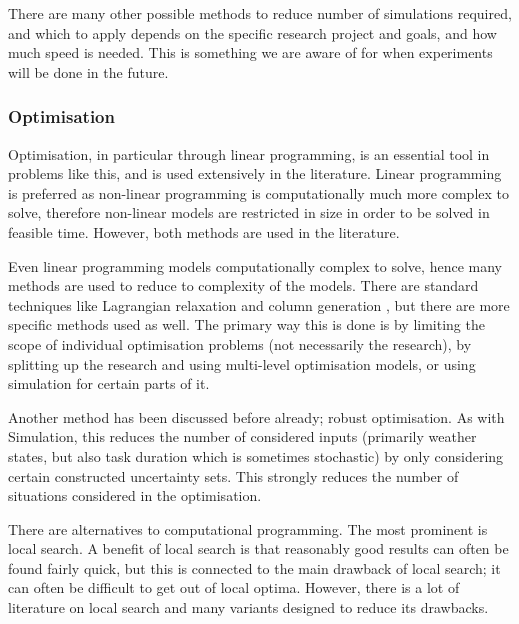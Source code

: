 \documentclass[a4paper,12pt]{article}
\begin{document}
There are many other possible methods to reduce number of simulations required, and which to apply depends on the specific research project and goals, and how much speed is needed. This is something we are aware of for when experiments will be done in the future. 

\bigskip

\subsubsection{Optimisation} \label{ss:opt}
Optimisation, in particular through linear programming, is an essential tool in problems like this, and is used extensively in the literature. Linear programming is preferred as non-linear programming is computationally much more complex to solve, therefore non-linear models are restricted in size in order to be solved in feasible time. However, both methods are used in the literature.

Even linear programming models computationally complex to solve, hence many methods are used to reduce to complexity of the models. There are standard techniques like Lagrangian relaxation \cite{fisher1981lagrangian} and column generation \cite{barnhart1998branch}, but there are more specific methods used as well. The primary way this is done is by limiting the scope of individual optimisation problems (not necessarily the research), by splitting up the research and using multi-level optimisation models, or using simulation for certain parts of it. 

Another method has been discussed before already; robust optimisation. As with Simulation, this reduces the number of considered inputs (primarily weather states, but also task duration which is sometimes stochastic) by only considering certain constructed uncertainty sets. This strongly reduces the number of situations considered in the optimisation. 

There are alternatives to computational programming. The most prominent is local search. A benefit of local search is that reasonably good results can often be found fairly quick, but this is connected to the main drawback of local search; it can often be difficult to get out of local optima. However, there is a lot of literature on local search and many variants designed to reduce its drawbacks. 

\bigskip
\end{document}

